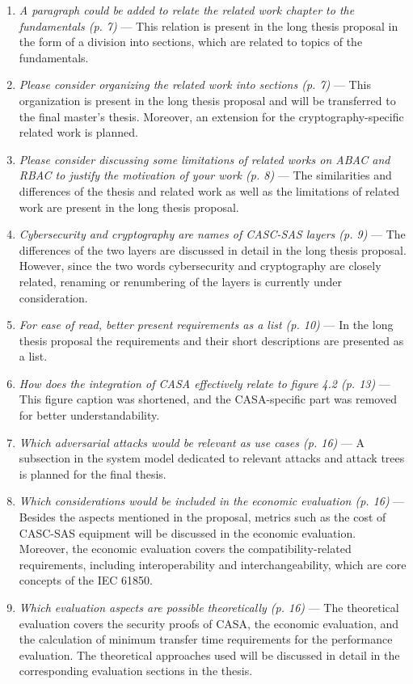 \begin{enumerate}[label=R\arabic*.]
\begin{enumerate}[label=Q\arabic*.]
        \item \textit{A paragraph could be added to relate the related work chapter to the fundamentals (p. 7)} --- This relation is present in the long thesis proposal in the form of a division into sections, which are related to topics of the fundamentals.
        \item \textit{Please consider organizing the related work into sections (p. 7)} --- This organization is present in the long thesis proposal and will be transferred to the final master's thesis. Moreover, an extension for the cryptography-specific related work is planned.
        \item \textit{Please consider discussing some limitations of related works on ABAC and RBAC to justify the motivation of your work (p. 8)} --- The similarities and differences of the thesis and related work as well as the limitations of related work are present in the long thesis proposal.
        \item \textit{Cybersecurity and cryptography are names of CASC-SAS layers (p. 9)} --- The differences of the two layers are discussed in detail in the long thesis proposal. However, since the two words cybersecurity and cryptography are closely related, renaming or renumbering of the layers is currently under consideration.
        \item \textit{For ease of read, better present requirements as a list (p. 10)} --- In the long thesis proposal the requirements and their short descriptions are presented as a list.
        \item \textit{How does the integration of CASA effectively relate to figure 4.2 (p. 13)} --- This figure caption was shortened, and the CASA-specific part was removed for better understandability.
        \item \textit{Which adversarial attacks would be relevant as use cases (p. 16)} --- A subsection in the system model dedicated to relevant attacks and attack trees is planned for the final thesis.
        \item \textit{Which considerations would be included in the economic evaluation (p. 16)} --- Besides the aspects mentioned in the proposal, metrics such as the cost of CASC-SAS equipment will be discussed in the economic evaluation. Moreover, the economic evaluation covers the compatibility-related requirements, including interoperability and interchangeability, which are core concepts of the IEC 61850.
        \item \textit{Which evaluation aspects are possible theoretically (p. 16)} --- The theoretical evaluation covers the security proofs of CASA, the economic evaluation, and the calculation of minimum transfer time requirements for the performance evaluation. The theoretical approaches used will be discussed in detail in the corresponding evaluation sections in the thesis.

\end{enumerate}
\end{enumerate}
